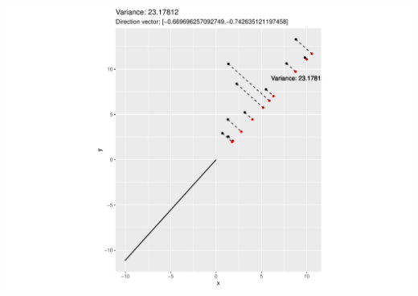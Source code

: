 \documentclass[
  ignorenonframetext,
]{beamer}
\begin{document}
\begin{frame}{}
\protect\hypertarget{section-23}{}
\includegraphics{note9_files/figure-beamer/unnamed-chunk-30-1.pdf}
\end{frame}
\end{document}

